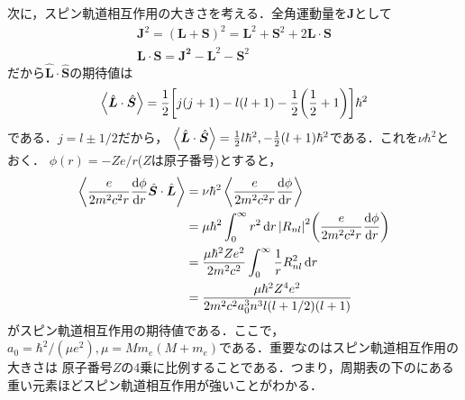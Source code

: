 \documentclass{report}
\begin{document}
  次に，スピン軌道相互作用の大きさを考える．全角運動量を$\bm{J}$として
  \begin{align}
    \bm{J}^2 = (\bm{L} + \bm{S})^2 = \bm{L}^2 + \bm{S}^2 + 2\bm{L}\cdot \bm{S}\\
    \bm{L}\cdot\bm{S} = \bm{J^2} - \bm{L}^2 - \bm{S}^2
  \end{align}
  だから$\hat{\bm{L}}\cdot\hat{\bm{S}}$の期待値は
  \begin{align}
    \ev{\hat{\bm{L}}\cdot\hat{\bm{S}} } = \frac{1}{2}\qty[j(j+1) - l(l+1) - \frac{1}{2}\qty(\frac{1}{2}+1)]\hbar^2
  \end{align}
  である．$j = l \pm 1/2$だから，
  $\ev{\hat{\bm{L}}\cdot\hat{\bm{S}} } = \frac{1}{2}l\hbar^2,-\frac{1}{2}(l+1)\hbar^2$である．これを$\nu\hbar^2$とおく．
  $\phi(r) = -Ze/r$($Z$は原子番号)とすると，
  \begin{align}
    \ev{\frac{e}{2m^2c^2r}\dv{\phi}{r}\hat{\bm{S}}\cdot\hat{\bm{L}} } &= \nu\hbar^2 \ev{\frac{e}{2m^2c^2r}\dv{\phi}{r} }\\
    &= \mu\hbar^2 \int_{0}^{\infty} r^2 \dd{r} \abs{R_{nl}}^2 \qty(\frac{e}{2m^2c^2r}\dv{\phi}{r})\\
    &= \frac{\mu\hbar^2 Z e^2}{2m^2c^2}\int_{0}^{\infty} \frac{1}{r}R_{nl}^2 \dd{r}\\
    &= \frac{\mu\hbar^2 Z^4 e^2}{2m^2 c^2 a_0^3n^3l(l+1/2)(l+1)}
  \end{align}
  がスピン軌道相互作用の期待値である．ここで，$a_0=\hbar^2/(\mu e^2),\mu = Mm_e(M+m_e)$である．重要なのはスピン軌道相互作用の大きさは
  原子番号$Z$の4乗に比例することである．つまり，周期表の下のにある重い元素ほどスピン軌道相互作用が強いことがわかる．
\end{document}
